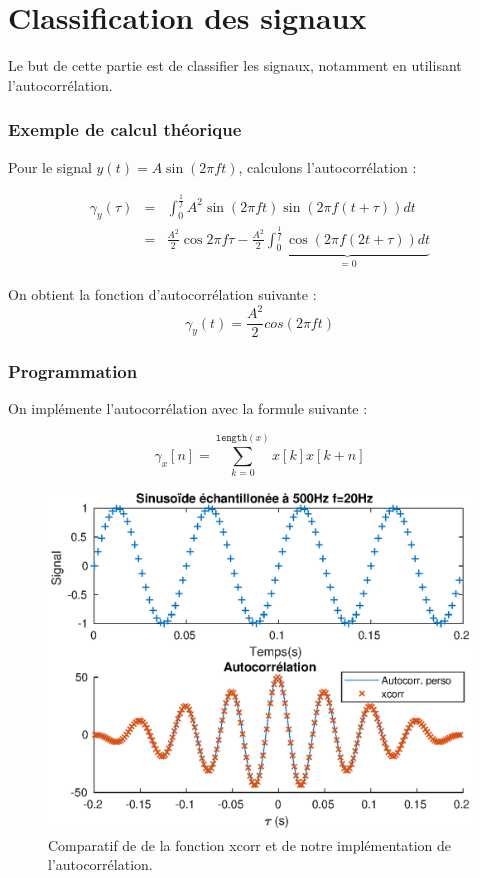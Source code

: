 \documentclass[french]{article}
\begin{document}
\FloatBarrier
\newpage
\part{ Classification des signaux}

Le but de cette partie est de classifier les signaux, notamment en utilisant l'autocorrélation.

\section{ Exemple de calcul théorique}

Pour le signal $y(t) = A \sin(2 \pi f t)$, calculons l'autocorrélation :

\begin{eqnarray}
\gamma_y(\tau) &=& \int_0^{\frac{1}{f}} A^2 \sin(2\pi f t) \sin(2 \pi f (t+\tau)) dt \\
&=& \frac{A^2}{2} \cos 2\pi f \tau - \frac{A^2}{2}\underbrace{\int_0^{\frac{1}{f}} \cos (2 \pi f (2t + \tau)) dt}_{=0}
\end{eqnarray}

On obtient la fonction d'autocorrélation suivante :
\begin{equation}
\gamma_y (t) = \frac{A^2} {2} cos(2 \pi f t)
\end{equation}

\section{ Programmation}

On implémente l'autocorrélation avec la formule suivante :

\begin{equation}
\gamma_x [n] = \sum_{k = 0} ^{\mathtt{length} (x)} x[k]x[k+n]
\end{equation}

\begin{figure}[h!]
	\centering
	\includegraphics{images/autocorr.eps}
	\caption{Comparatif de de la fonction xcorr et de notre implémentation de l'autocorrélation.}
	\label{autocorr}
\end{figure}
\end{document}

